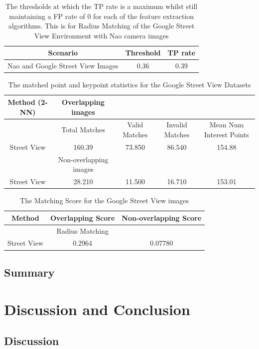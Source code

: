 \documentclass{report}
\begin{document}
\begin{table}
\caption{The thresholds at which the TP rate is a maximum whilst still maintaining
a FP rate of 0 for each of the feature extraction algorithms. This
is for Radius Matching of the Google Street View Environment with
Nao camera images}
\begin{tabular}{|c|c|c|}
\hline 
Scenario & Threshold & TP rate\tabularnewline
\hline 
\hline 
Nao and Google Street View Images & 0.36 & 0.39\tabularnewline
\hline 
\end{tabular}
\label{tab:tpStreetView}
\end{table}

\begin{table}
\caption{The matched point and keypoint statistics for the Google Street View
Datasets}
\begin{tabular}{|c|c|c|c|c|}
\hline 
Method (2-NN) & Overlapping images &  &  & \tabularnewline
\hline 
\hline 
 & Total Matches & Valid Matches & Invalid Matches & Mean Num Interest Points\tabularnewline
\hline 
Street View  & 160.39 & 73.850 & 86.540 & 154.88\tabularnewline
\hline 
 & Non-overlapping images &  &  & \tabularnewline
\hline 
Street View & 28.210 & 11.500 & 16.710 & 153.01\tabularnewline
\hline 
\end{tabular}
\label{tab:gsMK}
\end{table}

\begin{table}
\caption{The Matching Score for the Google Street View images}
\begin{tabular}{|c|c|c|}
\hline 
Method & Overlapping Score & Non-overlapping Score\tabularnewline
\hline 
\hline 
 & Radius Matching & \tabularnewline
\hline 
Street View & 0.2964 & 0.07780\tabularnewline
\hline 
\end{tabular}
\label{tab:gsMS}
\end{table}

\section{Summary}
\label{sec:summary}

\chapter{Discussion and Conclusion}
\label{sec:discussionConclusion}

\section{Discussion}
\label{sec:discussion}
\end{document}
